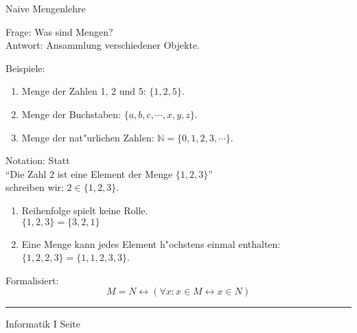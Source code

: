 
\begin{slide}{}
\normalsize
\begin{center}
Naive Mengenlehre
\end{center}
\vspace{0.5cm}

\footnotesize
Frage:   Was sind Mengen? \\
Antwort: Ansammlung verschiedener Objekte. 

Beispiele:
\begin{enumerate}
\item Menge der Zahlen 1, 2 und 5: \quad $\{1, 2, 5 \}$.
\item Menge der Buchstaben:       \quad $\{a, b, c, \cdots, x, y, z \}$.
\item Menge der nat"urlichen Zahlen: $\mathbb{N} = \{ 0, 1, 2, 3, \cdots \}$.
\end{enumerate}
Notation:  Statt \\[0.3cm]
\hspace*{1.3cm} ``Die Zahl $2$ ist eine Element der Menge $\{1, 2, 3\}$'' \\[0.3cm]
schreiben wir:  $2 \in \{ 1, 2, 3 \}$.

\begin{enumerate}
\item Reihenfolge spielt keine Rolle.\\[0.1cm]
      \hspace*{1.3cm} $\{ 1, 2, 3 \} = \{ 3, 2, 1 \}$
\item Eine Menge kann jedes Element h"ochstens einmal enthalten: \\[0.1cm]
\hspace*{1.3cm} $\{ 1, 2, 2, 3 \} = \{ 1, 1, 2, 3, 3 \}$.
\end{enumerate}

\begin{center}
\end{center}
Formalisiert:
$$ M = N \leftrightarrow (\forall x: x \in M \leftrightarrow x \in N) $$

\vspace*{\fill}
\tiny \addtocounter{mypage}{1}
\rule{15cm}{1mm}
Informatik I  \hspace*{\fill} Seite 
\end{slide}

